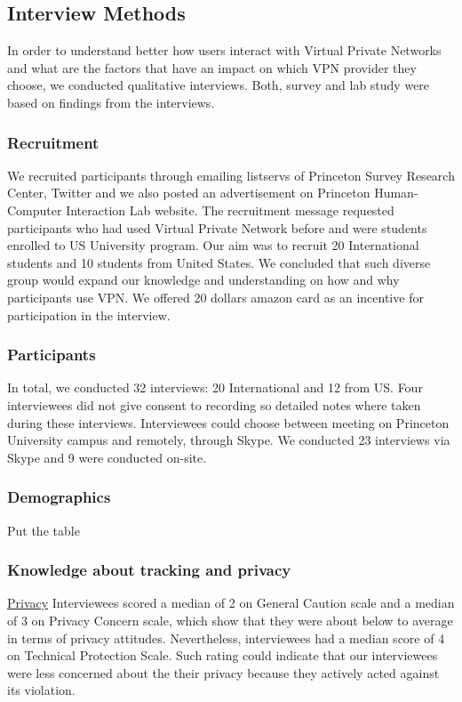 \subsection{Interview Methods}\label{Method}
In order to understand better how users interact with Virtual Private Networks and what are the factors that have an impact on which VPN provider they choose, we conducted qualitative interviews. Both, survey and lab study were based on findings from the interviews.
\subsubsection{Recruitment}
We recruited participants through emailing listservs of Princeton Survey Research Center, Twitter and we also posted an advertisement on Princeton Human-Computer Interaction Lab website. The recruitment message requested participants who had used Virtual Private Network before and were students enrolled to US University program. Our aim was to recruit 20 International students and 10 students from United States. We concluded that such diverse group would expand our knowledge and understanding on how and why participants use VPN. We offered 20 dollars amazon card as an incentive for participation in the interview.
\subsubsection{Participants}
In total, we conducted 32 interviews: 20 International and 12 from US. Four interviewees did not give consent to recording so detailed notes where taken during these interviews. Interviewees could choose between meeting on Princeton University campus and remotely, through Skype. We conducted 23 interviews via Skype and 9 were conducted on-site. 

\subsubsection{Demographics} Put the table

\subsubsection{Knowledge about tracking and privacy}
\label{sec:methods-tracking}

\underline{Privacy}
Interviewees scored a median of 2 on General Caution scale and a median of 3 on Privacy Concern scale, which show that they were about below to average in terms of privacy attitudes. Nevertheless, interviewees had a median score of 4 on Technical Protection Scale. Such rating could indicate that our interviewees were less concerned  about the their privacy because they actively acted against its violation. 

